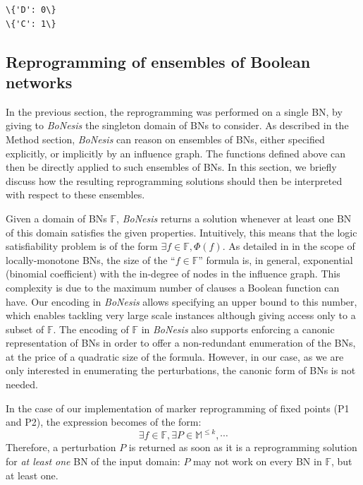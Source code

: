 \documentclass[PCJ,Unicode,screen,mode=plain]{cedram}
\begin{document}
    \begin{Verbatim}[commandchars=\\\{\}]
\{'D': 0\}
\{'C': 1\}

    \end{Verbatim}

\hypertarget{reprogramming-of-ensembles-of-boolean-networks}{%
\subsection{Reprogramming of ensembles of Boolean
networks}\label{reprogramming-of-ensembles-of-boolean-networks}}

In the previous section, the reprogramming was performed on a single BN,
by giving to \emph{BoNesis} the singleton domain of BNs to consider. As
described in the Method section, \emph{BoNesis} can reason on ensembles
of BNs, either specified explicitly, or implicitly by an influence
graph. The functions defined above can then be directly applied to such
ensembles of BNs. In this section, we briefly discuss how the resulting
reprogramming solutions should then be interpreted with respect to these
ensembles.

Given a domain of BNs \(\mathbb F\), \emph{BoNesis} returns a solution
whenever at least one BN of this domain satisfies the given properties.
Intuitively, this means that the logic satisfiability problem is of the
form \(\exists f\in \mathbb F, \Phi(f)\). As detailed in
\citep{bn-synthesis-ICTAI19} in the scope of locally-monotone BNs, the
size of the ``\(f\in\mathbb F\)'' formula is, in general, exponential
(binomial coefficient) with the in-degree of nodes in the influence
graph. This complexity is due to the maximum number of clauses a Boolean
function can have. Our encoding in \emph{BoNesis} allows specifying an
upper bound to this number, which enables tackling very large scale
instances although giving access only to a subset of \(\mathbb F\). The
encoding of \(\mathbb F\) in \emph{BoNesis} also supports enforcing a
canonic representation of BNs in order to offer a non-redundant
enumeration of the BNs, at the price of a quadratic size of the formula.
However, in our case, as we are only interested in enumerating the
perturbations, the canonic form of BNs is not needed.

In the case of our implementation of marker reprogramming of fixed
points (P1 and P2), the expression becomes of the form:
\[\exists f\in\mathbb F, \exists P\in\mathbb M^{\leq k}, \cdots\]
Therefore, a perturbation \(P\) is returned as soon as it is a
reprogramming solution for \emph{at least one} BN of the input domain:
\(P\) may not work on every BN in \(\mathbb F\), but at least one.
\end{document}
